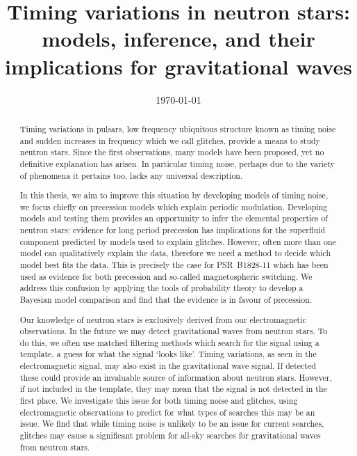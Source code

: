 \documentclass[twoside, 11pt]{thesis}
\begin{document}
\def\biblio{}

\frontmatter
\title      {Timing variations in neutron stars: models, inference, and their
             implications for gravitational waves}
\date       {\today}
\subject    {}
\keywords   {}
\maketitle

\begin{abstract}

Timing variations in pulsars, low frequency ubiquitous structure known as
timing noise and sudden increases in frequency which we call glitches, provide
a means to study neutron stars. Since the first observations, many models have
been proposed, yet no definitive explanation has arisen. In particular timing
noise, perhaps due to the variety of phenomena it pertains too, lacks any
universal description.

In this thesis, we aim to improve this situation by developing models of timing
noise, we focus chiefly on precession models which explain periodic modulation.
Developing models and testing them provides an opportunity to infer the
elemental properties of neutron stars: evidence for long period precession has
implications for the superfluid component predicted by models used to explain
glitches. However, often more than one model can
qualitatively explain the data, therefore we need a method to decide which
model best fits the data. This is precisely the case for
PSR~B1828-11 which has been used as evidence for both precession
and so-called magnetospheric switching. We address this confusion by applying the tools of
probability theory to develop a Bayesian model comparison and
find that the evidence is in favour of precession.

Our knowledge of neutron stars is exclusively derived from our electromagnetic
observations. In the future we may detect gravitational waves from neutron
stars. To do this, we often use matched filtering methods which search for the
signal using a template, a guess for what the signal `looks like'. Timing
variations, as seen in the electromagnetic signal, may also exist in the
gravitational wave signal. If detected these could provide an invaluable source
of information about neutron stars. However, if not included in the template,
they may mean that the signal is not detected in the first place. We
investigate this issue for both timing noise and glitches, using
electromagnetic observations to predict for what types of searches this may be
an issue. We find that while timing noise is unlikely to be an issue for current
searches, glitches may cause a significant problem for all-sky searches
for gravitational waves from neutron stars.
\end{abstract}
\end{document}
